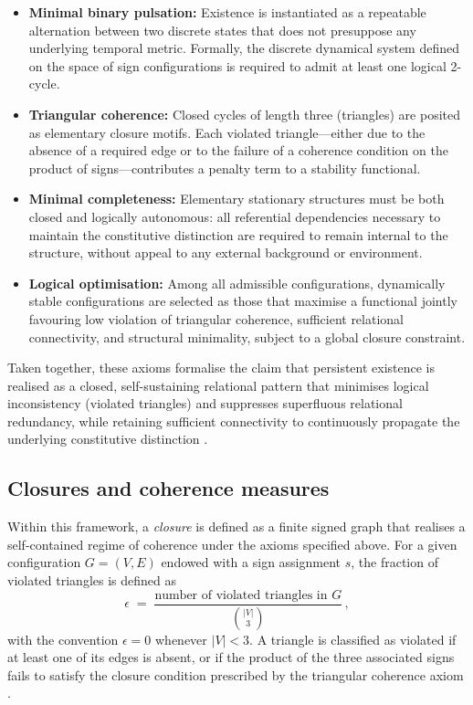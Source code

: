 \documentclass[11pt,a4paper]{article}
\begin{document}
\begin{itemize}[leftmargin=1.5em]
  \item \textbf{Minimal binary pulsation:} Existence is instantiated as a repeatable alternation between two discrete states that does not presuppose any underlying temporal metric. Formally, the discrete dynamical system defined on the space of sign configurations is required to admit at least one logical 2-cycle.

  \item \textbf{Triangular coherence:} Closed cycles of length three (triangles) are posited as elementary closure motifs. Each violated triangle—either due to the absence of a required edge or to the failure of a coherence condition on the product of signs—contributes a penalty term to a stability functional.

  \item \textbf{Minimal completeness:} Elementary stationary structures must be both closed and logically autonomous: all referential dependencies necessary to maintain the constitutive distinction are required to remain internal to the structure, without appeal to any external background or environment.

  \item \textbf{Logical optimisation:} Among all admissible configurations, dynamically stable configurations are selected as those that maximise a functional jointly favouring low violation of triangular coherence, sufficient relational connectivity, and structural minimality, subject to a global closure constraint.
\end{itemize}

Taken together, these axioms formalise the claim that persistent existence is realised as a closed, self-sustaining relational pattern that minimises logical inconsistency (violated triangles) and suppresses superfluous relational redundancy, while retaining sufficient connectivity to continuously propagate the underlying constitutive distinction \citep{PDL_Main_2026,PDL_position}.

\subsection{Closures and coherence measures}
\label{subsec:closures}

Within this framework, a \emph{closure} is defined as a finite signed graph that realises a self-contained regime of coherence under the axioms specified above. For a given configuration \(G = (V, E)\) endowed with a sign assignment \(s\), the fraction of violated triangles is defined as
\[
  \epsilon \;=\; \frac{\text{number of violated triangles in } G}{\binom{|V|}{3}} \, ,
\]
with the convention \(\epsilon = 0\) whenever \(|V| < 3\). A triangle is classified as violated if at least one of its edges is absent, or if the product of the three associated signs fails to satisfy the closure condition prescribed by the triangular coherence axiom \citep{PDL_Main_2026}.
\end{document}
